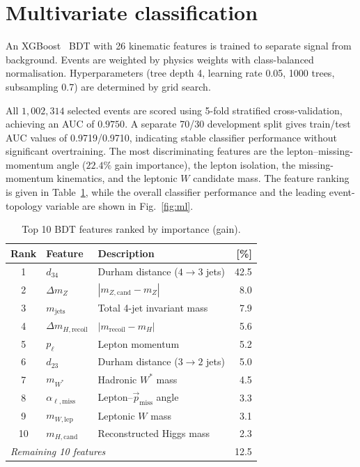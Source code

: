 \documentclass[a4paper,11pt]{article}
\begin{document}
\section{Multivariate classification}
\label{sec:bdt}

An XGBoost~\cite{XGBoost} BDT with 26 kinematic features is trained to separate signal from background.
Events are weighted by physics weights with class-balanced normalisation.
Hyperparameters (tree depth 4, learning rate 0.05, 1000 trees, subsampling 0.7) are determined by grid search.

All $1{,}002{,}314$ selected events are scored using 5-fold stratified cross-validation, achieving an AUC of $0.9750$.
A separate 70/30 development split gives train/test AUC values of 0.9719/0.9710, indicating stable classifier performance without significant overtraining.
The most discriminating features are the lepton--missing-momentum angle ($22.4\%$ gain importance), the lepton isolation, the missing-momentum kinematics, and the leptonic $W$ candidate mass.
The feature ranking is given in Table~\ref{tab:features}, while the overall classifier performance and the leading event-topology variable are shown in Fig.~\ref{fig:ml}.

\begin{table}[tb]
\centering
\caption{Top 10 BDT features ranked by importance (gain).}
\label{tab:features}
\small
\begin{tabular}{cllr}
\toprule
Rank & Feature & Description & [\%] \\
\midrule
1 & $d_{34}$ & Durham distance ($4 \to 3$ jets) & 42.5 \\
2 & $\Delta m_Z$ & $|m_{Z,\mathrm{cand}} - m_Z|$ & 8.0 \\
3 & $m_{\mathrm{jets}}$ & Total 4-jet invariant mass & 7.9 \\
4 & $\Delta m_{H,\mathrm{recoil}}$ & $|m_{\mathrm{recoil}} - m_H|$ & 5.6 \\
5 & $p_\ell$ & Lepton momentum & 5.2 \\
6 & $d_{23}$ & Durham distance ($3 \to 2$ jets) & 5.0 \\
7 & $m_{W^*}$ & Hadronic $W^*$ mass & 4.5 \\
8 & $\alpha_{\ell,\mathrm{miss}}$ & Lepton--$\vec{p}_{\mathrm{miss}}$ angle & 3.3 \\
9 & $m_{W,\mathrm{lep}}$ & Leptonic $W$ mass & 3.1 \\
10 & $m_{H,\mathrm{cand}}$ & Reconstructed Higgs mass & 2.3 \\
\midrule
\multicolumn{3}{l}{\textit{Remaining 10 features}} & 12.5 \\
\bottomrule
\end{tabular}
\end{table}
\end{document}
